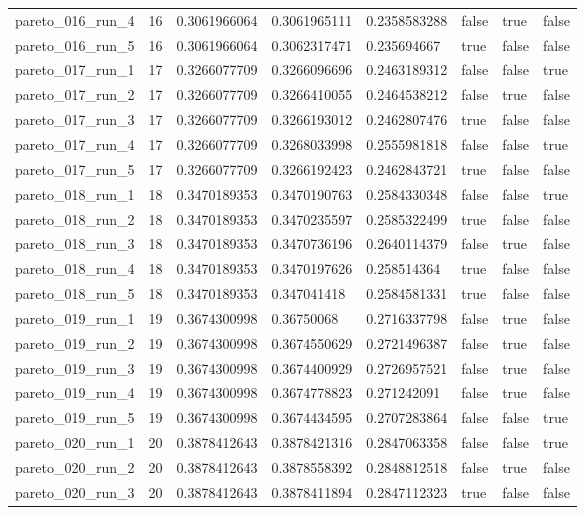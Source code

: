 \begin{tabular}{@{}llllllll@{}}
pareto\_016\_run\_4 & 16 & 0.3061966064 & 0.3061965111 & 0.2358583288 & false & true & false \\
pareto\_016\_run\_5 & 16 & 0.3061966064 & 0.3062317471 & 0.235694667 & true & false & false \\
pareto\_017\_run\_1 & 17 & 0.3266077709 & 0.3266096696 & 0.2463189312 & false & false & true \\
pareto\_017\_run\_2 & 17 & 0.3266077709 & 0.3266410055 & 0.2464538212 & false & true & false \\
pareto\_017\_run\_3 & 17 & 0.3266077709 & 0.3266193012 & 0.2462807476 & true & false & false \\
pareto\_017\_run\_4 & 17 & 0.3266077709 & 0.3268033998 & 0.2555981818 & false & false & true \\
pareto\_017\_run\_5 & 17 & 0.3266077709 & 0.3266192423 & 0.2462843721 & true & false & false \\
pareto\_018\_run\_1 & 18 & 0.3470189353 & 0.3470190763 & 0.2584330348 & false & false & true \\
pareto\_018\_run\_2 & 18 & 0.3470189353 & 0.3470235597 & 0.2585322499 & true & false & false \\
pareto\_018\_run\_3 & 18 & 0.3470189353 & 0.3470736196 & 0.2640114379 & false & true & false \\
pareto\_018\_run\_4 & 18 & 0.3470189353 & 0.3470197626 & 0.258514364 & true & false & false \\
pareto\_018\_run\_5 & 18 & 0.3470189353 & 0.347041418 & 0.2584581331 & true & false & false \\
pareto\_019\_run\_1 & 19 & 0.3674300998 & 0.36750068 & 0.2716337798 & false & true & false \\
pareto\_019\_run\_2 & 19 & 0.3674300998 & 0.3674550629 & 0.2721496387 & false & true & false \\
pareto\_019\_run\_3 & 19 & 0.3674300998 & 0.3674400929 & 0.2726957521 & false & true & false \\
pareto\_019\_run\_4 & 19 & 0.3674300998 & 0.3674778823 & 0.271242091 & false & true & false \\
pareto\_019\_run\_5 & 19 & 0.3674300998 & 0.3674434595 & 0.2707283864 & false & false & true \\
pareto\_020\_run\_1 & 20 & 0.3878412643 & 0.3878421316 & 0.2847063358 & false & false & true \\
pareto\_020\_run\_2 & 20 & 0.3878412643 & 0.3878558392 & 0.2848812518 & false & true & false \\
pareto\_020\_run\_3 & 20 & 0.3878412643 & 0.3878411894 & 0.2847112323 & true & false & false \\

\end{tabular}
